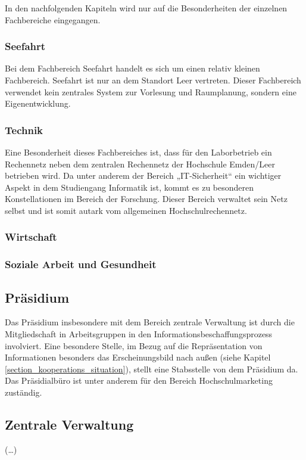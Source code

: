 
In den nachfolgenden Kapiteln wird nur auf die Besonderheiten der einzelnen Fachbereiche eingegangen.

\subsubsection{Seefahrt}
Bei dem Fachbereich Seefahrt handelt es sich um einen relativ kleinen Fachbereich. Seefahrt ist  nur an dem Standort Leer vertreten. Dieser Fachbereich verwendet kein zentrales System zur Vorlesung und Raumplanung, sondern eine Eigenentwicklung.

\subsubsection{Technik}
Eine Besonderheit dieses Fachbereiches ist, dass für den Laborbetrieb ein Rechennetz neben dem zentralen Rechennetz der Hochschule Emden/Leer betrieben wird. Da unter anderem der Bereich „IT-Sicherheit“ ein wichtiger Aspekt in dem Studiengang Informatik ist, kommt es zu besonderen Konstellationen im Bereich der Forschung. Dieser Bereich verwaltet sein Netz selbst und ist somit autark vom allgemeinen Hochschulrechennetz.

\subsubsection{Wirtschaft}
\subsubsection{Soziale Arbeit und Gesundheit}

\subsection{Präsidium}
Das Präsidium insbesondere mit dem Bereich zentrale Verwaltung ist durch die Mitgliedschaft in Arbeitsgruppen in den Informationsbeschaffungsprozess involviert. Eine besondere Stelle, im Bezug auf die Repräsentation von Informationen besonders das Erscheinungsbild nach außen (siehe Kapitel \ref{section_kooperations_situation}), stellt eine Stabsstelle von dem Präsidium da. Das Präsidialbüro ist unter anderem für den Bereich Hochschulmarketing zuständig.

\subsection{Zentrale Verwaltung}
(\ldots)
